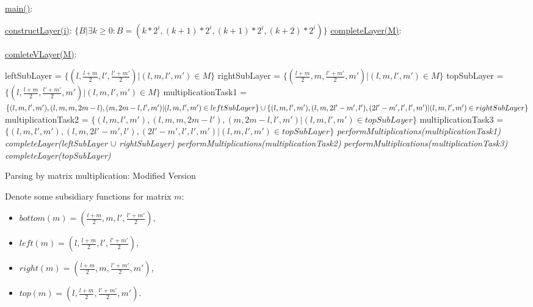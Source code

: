 \documentclass[runningheads]{llncs}
\begin{document}
\begin{algorithm}
\SetAlgoNoLine
{}
\underline{main()}{:}{
 
 \BlankLine
 }
 
\underline{constructLayer(i)}{:}{
 \BlankLine
 $\{B | \exists k \geq 0 : B = (k*2^i, (k+1)*2^i, (k + 1)*2^i, (k+2)*2^i) \}$
 \BlankLine
    }
\underline{completeLayer(M)}{:}{
\BlankLine
{}
\BlankLine
}
 
\underline{comleteVLayer(M)}{:}{
 \BlankLine
 leftSubLayer = $\{ (l, \frac{l+m}{2}, l', \frac{l'+m'}{2}) | (l, m, l', m') \in M\}$\;
 rightSubLayer = $\{ (\frac{l+m}{2}, m, \frac{l'+m'}{2}, m') | (l, m, l', m') \in M\}$\;
 topSubLayer = $\{ (l, \frac{l+m}{2}, \frac{l'+m'}{2}, m') | (l, m, l', m') \in M\}$\;
 multiplicationTask1 = $\{(l, m, l', m'), (l, m, m, 2m - l), (m, 2m - l, l', m') | (l, m, l', m') \in leftSubLayer\} \cup \linebreak  \{(l, m, l', m'), (l, m, 2l' - m', l'), (2l' - m', l', l', m') | (l, m, l', m') \in rightSubLayer\}$\;
 \BlankLine
 multiplicationTask2 = $\{(l, m, l', m'), (l, m, m, 2m - l'), (m, 2m - l, l', m') | (l, m, l', m') \in topSubLayer\}$\;
 \BlankLine 
 multiplicationTask3 = $\{(l, m, l', m'), (l, m, 2l' - m', l'), (2l' - m', l', l', m') | (l, m, l', m') \in topSubLayer\}$\;
 \BlankLine
 \textit{performMultiplications(multiplicationTask1)}\;
 \textit{completeLayer(leftSubLayer $\cup$ rightSubLayer)}\;
 \textit{performMultiplications(multiplicationTask2)}\;
 \textit{performMultiplications(multiplicationTask3)}\;
 \textit{completeLayer(topSubLayer)}
 
 }

\caption{Parsing by matrix multiplication:  Modified Version}
\end{algorithm}
 
\newpage
Denote some subsidiary functions for matrix $m$:
 \begin{itemize}
  \item $bottom(m) = (\frac{l+m}{2}, m, l', \frac{l'+m'}{2})$,
  \item $left(m) = (l, \frac{l+m}{2}, l', \frac{l'+m'}{2})$,
  \item $right(m) = (\frac{l+m}{2}, m, \frac{l'+m'}{2}, m')$, 
  \item $top(m) = (l, \frac{l+m}{2}, \frac{l'+m'}{2}, m')$.
\end{itemize}
 
\end{document}
